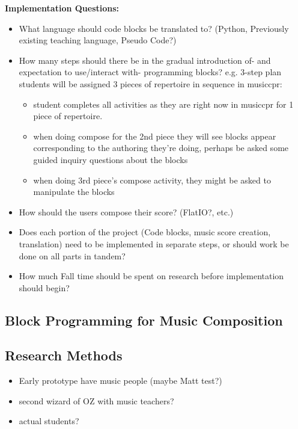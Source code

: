 \documentclass[manuscript,screen,review]{acmart}
\begin{document}
\textbf{Implementation Questions:}
\begin{itemize}
    \item What language should code blocks be translated to? (Python, Previously existing teaching language, Pseudo Code?)
    \item How many steps should there be in the gradual introduction of- and expectation to use/interact with- programming blocks? e.g. 3-step plan students will be assigned 3 pieces of repertoire in sequence in musiccpr: 
    \begin{itemize}
        \item student completes all activities as they are right now in musiccpr for 1 piece of repertoire.
        \item when doing compose for the 2nd piece they will see blocks appear corresponding to the authoring they're doing, perhaps be asked some guided inquiry questions about the blocks
        \item when doing 3rd piece's compose activity, they might be asked to manipulate the blocks
    \end{itemize}
    \item How should the users compose their score? (FlatIO?, etc.)
    \item Does each portion of the project (Code blocks, music score creation, translation) need to be implemented in separate steps, or should work be done on all parts in tandem?
    \item How much Fall time should be spent on research before implementation should begin?
\end{itemize}

\subsection{Block Programming for Music Composition}




\subsection{Research Methods}
\begin{itemize}
    \item Early prototype have music people (maybe Matt test?)
    \item second wizard of OZ with music teachers?
    \item actual students?
\end{itemize}
\end{document}
